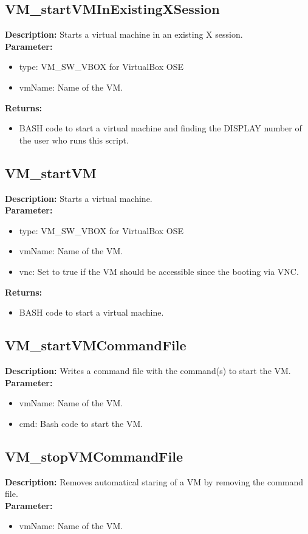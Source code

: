 \subsection{VM\_startVMInExistingXSession}
\textbf{Description:} Starts a virtual machine in an existing X session.\\
\textbf{Parameter:}
\begin{itemize}
\item type: VM\_SW\_VBOX for VirtualBox OSE
\item vmName: Name of the VM.
\end{itemize}
\textbf{Returns:}
\begin{itemize}
\item BASH code to start a virtual machine and finding the DISPLAY number of the user who runs this script.
\end{itemize}

\subsection{VM\_startVM}
\textbf{Description:} Starts a virtual machine.\\
\textbf{Parameter:}
\begin{itemize}
\item type: VM\_SW\_VBOX for VirtualBox OSE
\item vmName: Name of the VM.
\item vnc: Set to true if the VM should be accessible since the booting via VNC.
\end{itemize}
\textbf{Returns:}
\begin{itemize}
\item BASH code to start a virtual machine.
\end{itemize}

\subsection{VM\_startVMCommandFile}
\textbf{Description:} Writes a command file with the command(s) to start the VM.\\
\textbf{Parameter:}
\begin{itemize}
\item vmName: Name of the VM.
\item cmd: Bash code to start the VM.
\end{itemize}

\subsection{VM\_stopVMCommandFile}
\textbf{Description:} Removes automatical staring of a VM by removing the command file.\\
\textbf{Parameter:}
\begin{itemize}
\item vmName: Name of the VM.
\end{itemize}

